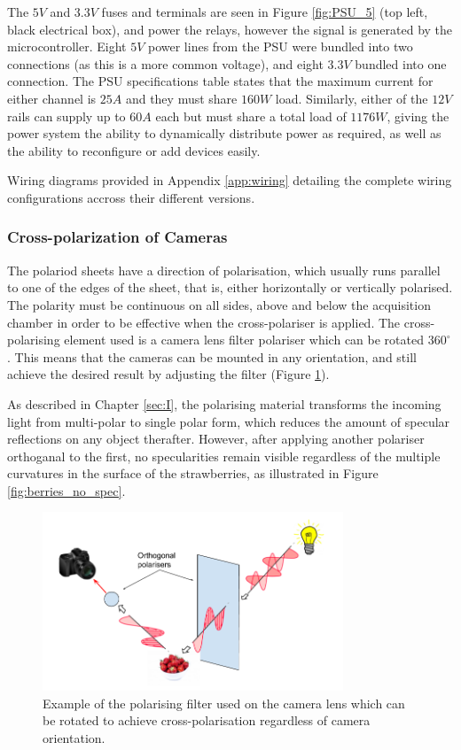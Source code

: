 \documentclass[fleqn,twoside]{article}
\begin{document}
The $5V$ and $3.3V$ fuses and terminals are seen in Figure \ref{fig:PSU_5} (top left, black electrical box), and power the relays, however the signal is generated by the microcontroller. Eight $5V$ power lines from the PSU were bundled into two connections (as this is a more common voltage), and eight $3.3V$ bundled into one connection. The PSU specifications table states that the maximum current for either channel is $25A$ and they must share $160W$ load. Similarly, either of the $12V$ rails can supply up to $60A$ each but must share a total load of $1176W$, giving the power system the ability to dynamically distribute power as required, as well as the ability to reconfigure or add devices easily.

Wiring diagrams provided in Appendix \ref{app:wiring} detailing the complete wiring configurations accross their different versions.



\subsubsection{Cross-polarization of Cameras}


The polariod sheets have a direction of polarisation, which usually runs parallel to one of the edges of the sheet, that is, either horizontally or vertically polarised. The polarity must be continuous on all sides, above and below the acquisition chamber in order to be effective when the cross-polariser is applied. The cross-polarising element used is a camera lens filter polariser which can be rotated $360^{\circ}$. This means that the cameras can be mounted in any orientation, and still achieve the desired result by adjusting the filter (Figure \ref{fig:nd_filters}).


As described in Chapter \ref{sec:I}, the polarising material transforms the incoming light from multi-polar to single polar form, which reduces the amount of specular reflections on any object therafter. However, after applying another polariser orthoganal to the first, no specularities remain visible regardless of the multiple curvatures in the surface of the strawberries, as illustrated in Figure \ref{fig:berries_no_spec}. 

\begin{figure}[h]
	\centering
	\includegraphics[width=0.8\textwidth]{cross-polariser.png}
	\caption{Example of the polarising filter used on the camera lens which can be rotated to achieve cross-polarisation regardless of camera orientation.}
	\label{fig:nd_filters}
\end{figure}
\end{document}
